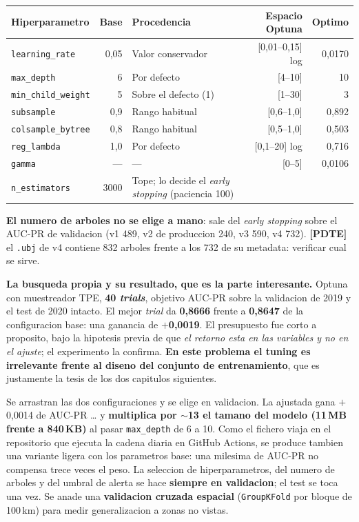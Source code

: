\documentclass[10pt,a4paper]{article}
\newcommand{\var}[1]{\texttt{\footnotesize #1}}
\newcommand{\pdte}[1]{{\color{red}\footnotesize\textbf{[PDTE]} #1}}
\begin{document}
\begin{center}\footnotesize
\begin{tabular}{@{}lrL{4.0cm}rr@{}}
\toprule
\textbf{Hiperparametro} & \textbf{Base} & \textbf{Procedencia} & \textbf{Espacio Optuna} & \textbf{Optimo} \\
\midrule
\var{learning\_rate}    & 0,05 & Valor conservador     & [0,01--0,15] log & 0,0170 \\
\var{max\_depth}        & 6    & Por defecto           & [4--10]          & 10 \\
\var{min\_child\_weight}& 5    & Sobre el defecto (1)  & [1--30]          & 3 \\
\var{subsample}         & 0,9  & Rango habitual        & [0,6--1,0]       & 0,892 \\
\var{colsample\_bytree} & 0,8  & Rango habitual        & [0,5--1,0]       & 0,503 \\
\var{reg\_lambda}       & 1,0  & Por defecto           & [0,1--20] log    & 0,716 \\
\var{gamma}             & ---  & ---                   & [0--5]           & 0,0106 \\
\var{n\_estimators}     & 3000 & Tope; lo decide el \emph{early stopping} (paciencia 100) & & \\
\bottomrule
\end{tabular}
\end{center}

\textbf{El numero de arboles no se elige a mano}: sale del \emph{early stopping} sobre el AUC-PR de
validacion (v1 489, v2 de produccion 240, v3 590, v4 732).
\pdte{el \var{.ubj} de v4 contiene 832 arboles frente a los 732 de su metadata: verificar cual se
sirve.}

\textbf{La busqueda propia y su resultado, que es la parte interesante.} Optuna con muestreador
TPE, \textbf{40 \emph{trials}}, objetivo AUC-PR sobre la validacion de 2019 y el test de 2020
intacto. El mejor \emph{trial} da \textbf{0,8666} frente a \textbf{0,8647} de la configuracion
base: una ganancia de \textbf{$+$0,0019}. El presupuesto fue corto a proposito, bajo la hipotesis
previa de que \emph{el retorno esta en las variables y no en el ajuste}; el experimento la confirma.
\textbf{En este problema el tuning es irrelevante frente al diseno del conjunto de entrenamiento},
que es justamente la tesis de los dos capitulos siguientes.

Se arrastran las dos configuraciones y se elige en validacion. La ajustada gana $+$0,0014 de AUC-PR
\ldots{} y \textbf{multiplica por $\sim$13 el tamano del modelo (11\,MB frente a 840\,KB)} al pasar
\var{max\_depth} de 6 a 10. Como el fichero viaja en el repositorio que ejecuta la cadena diaria en
GitHub Actions, se produce tambien una variante ligera con los parametros base: una milesima de
AUC-PR no compensa trece veces el peso. La seleccion de hiperparametros, del numero de arboles y
del umbral de alerta se hace \textbf{siempre en validacion}; el test se toca una vez. Se anade una
\textbf{validacion cruzada espacial} (\var{GroupKFold} por bloque de 100\,km) para medir
generalizacion a zonas no vistas.
\end{document}
